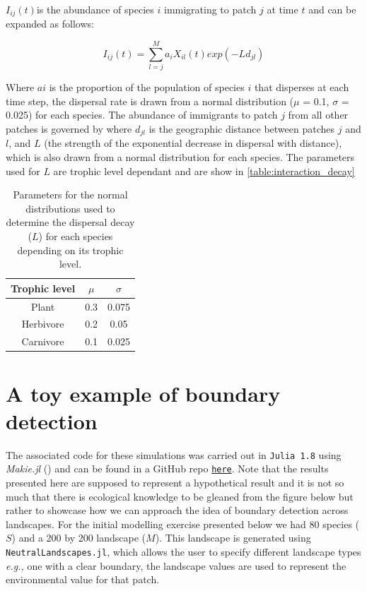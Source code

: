 \begin{refsection}
$I_{ij}(t) $is the abundance of species $i$ immigrating to patch $j$ at time $t$
and can be expanded as follows:

\begin{equation} \label{eq:metacomm_imm}
I_{ij}(t)=\sum_{l=j}^{M}a_iX_{il}(t)exp(-Ld_{jl})
\end{equation}

Where $ai$ is the proportion of the population of species $i$ that disperses at each time step, the dispersal rate is drawn from a normal distribution ($\mu$ = 0.1, $\sigma$ = 0.025) for each species. The abundance of immigrants to patch $j$ from all other patches is governed by where $d_{jl}$ is the geographic distance between patches $j$ and $l$, and $L$ (the strength of the exponential decrease in dispersal with distance), which is also drawn from a normal distribution for each species. The parameters used for $L$ are trophic level dependant and are show in \autoref{table:interaction_decay}

\begin{table}[h!]
\centering
\begin{tabular}{||c c c||} 
 \hline
Trophic level & $\mu$ & $\sigma$ \\ [0.5ex] \hline\hline
 Plant & 0.3 & 0.075 \\ 
 Herbivore & 0.2 & 0.05 \\
 Carnivore & 0.1 & 0.025 \\ [1ex] 
 \hline
\end{tabular}
\caption{Parameters for the normal distributions used to determine the dispersal
decay ($L$) for each species depending on its trophic level.}
\label{table:interaction_decay}
\end{table}

\section{A toy example of boundary detection}

The associated code for these simulations was carried out in \texttt{Julia 1.8} \cite{Bezanson2017Julia} using \emph{Makie.jl} (\cite{Danisch2021Makie}) and can be found in a GitHub repo \href{https://github.com/PoisotLab/Omnomnomivores}{\texttt{here}}. Note that the results presented here are supposed to represent a hypothetical result and it is not so much that there is ecological knowledge to be gleaned from the figure below but rather to showcase how we can approach the idea of boundary detection across landscapes. For the initial modelling exercise presented below we had 80 species ($S$) and a 200 by 200 landscape ($M$). This landscape is generated using \texttt{NeutralLandscapes.jl}, which allows the user to specify different landscape types \emph{e.g.,} one with a clear boundary, the landscape values are used to represent the environmental value for that patch.


\end{refsection}
